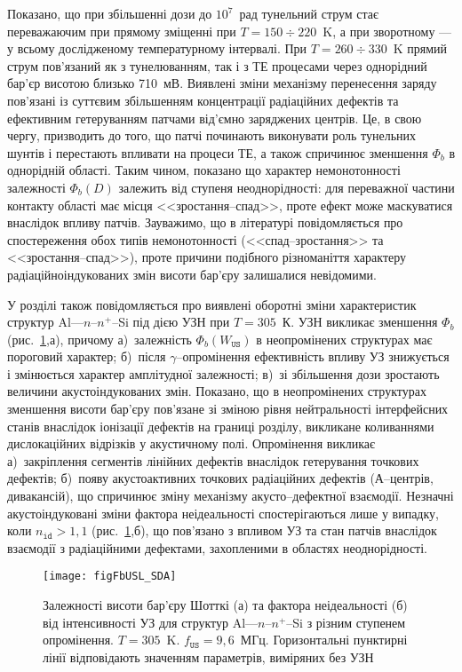 Показано, що
при збільшенні дози до $10^7$~рад тунельний струм стає переважаючим
при прямому зміщенні при $T=150\div220$~K,
а при зворотному --- у всьому дослідженому температурному інтервалі.
При $T=260\div330$~K прямий струм пов'язаний як з тунелюванням, так і з ТЕ процесами через однорідний бар'єр висотою близько 710~мВ.
Виявлені зміни механізму перенесення заряду пов'язані із суттєвим збільшенням концентрації радіаційних дефектів та ефективним гетеруванням патчами від'ємно заряджених центрів.
Це, в свою чергу, призводить до того, що патчі починають виконувати роль тунельних шунтів і перестають впливати на процеси ТЕ, а також спричинює зменшення $\Phi_b$ в однорідній області.
Таким чином, показано що
характер немонотонності залежності $\Phi_b(D)$ залежить від ступеня неоднорідності:
для переважної частини контакту області має місця <<зростання--спад>>, проте ефект може маскуватися внаслідок впливу патчів.
Зауважимо, що в літературі повідомляється про спостереження обох типів немонотонності (<<спад--зростання>> та <<зростання--спад>>),
проте причини подібного різноманіття характеру радіаційноіндукованих змін висоти бар'єру залишалися невідомими.

У розділі також повідомляється про виявлені оборотні зміни характеристик структур Al---$n$--$n^+$--Si під дією УЗН при $T\!=\!305$~К.
УЗН викликає зменшення $\Phi_b$ (рис.~\ref{figFbUSL_SDA},а), причому
а)~залежність $\Phi_b(W_\mathtt{US})$ в неопромінених структурах має пороговий характер;
б)~після $\gamma$--опромінення ефективність впливу УЗ знижується і змінюється характер амплітудної залежності;
в)~зі збільшення дози зростають величини акустоіндукованих змін.
Показано, що в неопромінених структурах зменшення висоти бар'єру пов'язане зі зміною рівня нейтральності інтерфейсних станів
внаслідок іонізації дефектів на границі розділу, викликане коливаннями дислокаційних відрізків у акустичному полі.
Опромінення викликає
а)~закріплення сегментів лінійних дефектів внаслідок гетерування точкових дефектів;
б)~появу акустоактивних точкових радіаційних дефектів (А--центрів, дивакансій),
що спричинює зміну механізму акусто--дефектної взаємодії.
Незначні акустоіндуковані зміни фактора неідеальності спостерігаються лише у випадку, коли $n_\mathtt{id}>1,1$ (рис.~\ref{figFbUSL_SDA},б),
що пов'язано з впливом УЗ та стан патчів внаслідок взаємодії з радіаційними дефектами, захопленими в областях неоднорідності.

\begin{figure}
\center
\texttt{[image: figFbUSL\_SDA]}
\caption{\label{figFbUSL_SDA}
Залежності висоти бар'єру Шотткі (а) та фактора неідеальності (б)  від інтенсивності УЗ для
структур Al---$n$--$n^+$--Si з різним ступенем опромінення.
$T=305$~K.
$f_\mathtt{US}=9,6$~МГц.
Горизонтальні пунктирні лінії відповідають значенням параметрів, виміряних без УЗН
}%
\end{figure}

